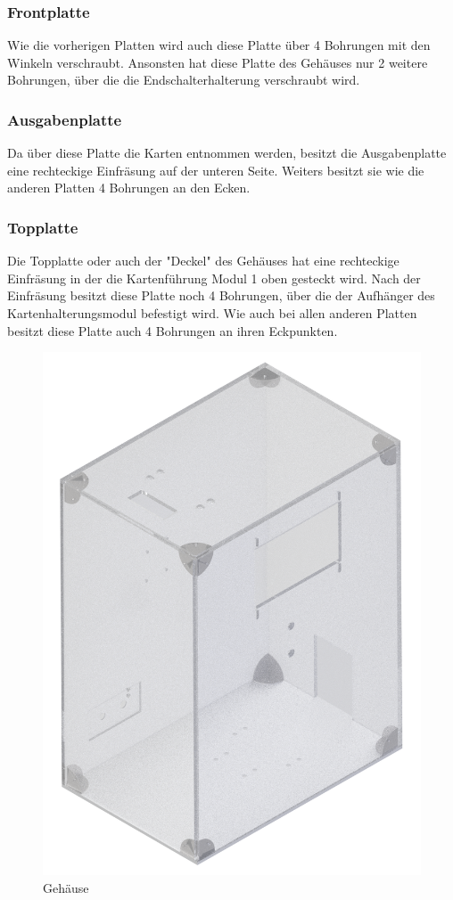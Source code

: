 \subsubsection{Frontplatte}
Wie die vorherigen Platten wird auch diese Platte über 4 Bohrungen mit den Winkeln verschraubt.
Ansonsten hat diese Platte des Gehäuses nur 2 weitere Bohrungen, über die die Endschalterhalterung verschraubt wird.

\subsubsection{Ausgabenplatte}
Da über diese Platte die Karten entnommen werden, besitzt die Ausgabenplatte eine rechteckige Einfräsung auf der unteren
Seite.
Weiters besitzt sie wie die anderen Platten 4 Bohrungen an den Ecken.

\subsubsection{Topplatte}
Die Topplatte oder auch der "Deckel" des Gehäuses hat eine rechteckige Einfräsung in der die Kartenführung Modul 1 oben
gesteckt wird. Nach der Einfräsung besitzt diese Platte noch 4 Bohrungen, über die der Aufhänger des Kartenhalterungsmodul
befestigt wird.
Wie auch bei allen anderen Platten besitzt diese Platte auch 4 Bohrungen an ihren Eckpunkten.

\begin{figure}[H]
    \centering
    \includegraphics[scale=0.2,page=1]{fig/mech/Gehauuse.png}
    \caption{Gehäuse}
\end{figure}

